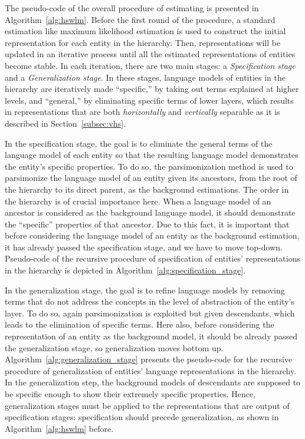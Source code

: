 The pseudo-code of the overall procedure of estimating \achswlm is presented in Algorithm~\ref{alg:hswlm}. 
Before the first round of the procedure, a standard estimation like maximum likelihood estimation is used to construct the initial representation for each entity in the hierarchy. 
Then, representations will be updated in an iterative process until all the estimated representations of entities become stable. 
In each iteration, there are two main stages: a \emph{Specification stage} and a \emph{Generalization stage}. 
In these stages, language models of entities in the hierarchy are iteratively made ``specific,'' by taking out terms explained at higher levels, and ``general,'' by eliminating specific terms of lower layers, which results in representations that are both \emph{horizontally} and \emph{vertically} separable as it is described in Section~\ref{subsec:vhs}.

In the specification stage, the goal is to eliminate the general terms of the language model of each entity so that the resulting language model demonstrates the entity's specific properties.  
To do so, the parsimonization method is used to parsimonize the language model of an entity given its ancestors, from the root of the hierarchy to its direct parent, as the background estimations. 
%
The order in the hierarchy is of crucial importance here. 
When a language model of an ancestor is considered as the background language model, it should demonstrate the ``specific'' properties of that ancestor. Due to this fact, it is important that before considering the language model of an entity as the background estimation, it has already passed the specification stage, and we have to move top-down.
Pseudo-code of the recursive procedure of specification of entities' representations in the hierarchy is depicted in Algorithm~\ref{alg:specification_stage}.




In the generalization stage, the goal is to refine language models by removing terms that do not address the concepts in the level of abstraction of the entity's layer.
To do so, again parsimonization is exploited but given descendants, which leads to the elimination of specific terms. 
Here also, before considering the representation of an entity as the background model, it should be already passed the generalization stage, so generalization moves bottom up.
Algorithm~\ref{alg:generalization_stage} presents the pseudo-code for the recursive procedure of generalization of entities' language representations in the hierarchy. 
In the generalization step, the background models of descendants are supposed to be specific enough to show their extremely specific properties. Hence, generalization stages must be applied to the representations that are output of specification stages: specification should precede generalization, as shown in Algorithm~\ref{alg:hswlm} before.
